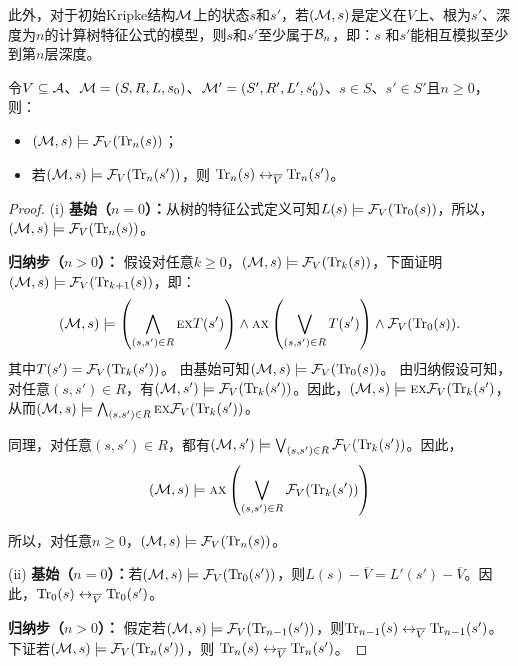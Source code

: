 此外，对于初始Kripke结构${\cal M}$上的状态$s$和$s'$，若$({\cal M},s)$是定义在$V$上、根为$s'$、深度为$n$的计算树特征公式的模型，则$s$和$s'$至少属于${\cal B}_n$，即：$s$ 和$s'$能相互模拟至少到第$n$层深度。

\begin{lemma}\label{Bn:to:Tn}
	令$V\subseteq {\cal A}$、${\cal M}=(S, R, L,s_0)$、${\cal M}'=(S', R', L',s_0')$、$s\in S$、$s'\in S'$且$n\ge 0$，则：
	\begin{itemize}
		\item[(i)] $({\cal M},s)\models{\cal F}_V(\textrm{Tr}_n(s))$；
		\item[(ii)] 若$({\cal M},s)\models{\cal F}_V(\textrm{Tr}_n(s'))$，则
		$\textrm{Tr}_n(s) \leftrightarrow_{\overline V} \textrm{Tr}_n(s')$。
	\end{itemize}
\end{lemma}
\begin{proof}
	(i) \textbf{基始（$n=0$）：}从树的特征公式定义可知$L(s) \models {\cal F}_V(\textrm{Tr}_0(s))$，所以，$({\cal M},s)\models{\cal F}_V(\textrm{Tr}_n(s))$。
	
	\textbf{归纳步（$n>0$）：} 假设对任意$k\geq 0$，$({\cal M},s)\models{\cal F}_V(\textrm{Tr}_k(s))$，下面证明$({\cal M},s)\models{\cal F}_V(\textrm{Tr}_{k+1}(s))$，即：
	\begin{equation*}
		({\cal M},s)\models \left(\bigwedge_{(s,s')\in R}
		\textsc{e} \textsc{x} T(s')\right)
		\wedge \textsc{a} \textsc{x}\left(\bigvee_{(s,s')\in R}
		T(s')\right)
		\wedge {\cal F}_V(\textrm{Tr}_0(s)).
	\end{equation*}
	其中$T(s') ={\cal F}_V(\textrm{Tr}_k(s'))$。
	由基始可知$({\cal M},s)\models {\cal F}_V(\textrm{Tr}_0(s))$。
	由归纳假设可知，对任意$(s,s') \in R$，有$({\cal M}, s') \models {\cal F}_V(\textrm{Tr}_k(s'))$。因此，$({\cal M},s)\models \textsc{e} \textsc{x} {\cal F}_V(\textrm{Tr}_k(s')$，从而$({\cal M},s)\models \bigwedge_{(s,s')\in R}
	\textsc{e} \textsc{x} {\cal F}_V(\textrm{Tr}_k(s'))$。
	
	同理，对任意$(s,s') \in R$，都有$({\cal M}, s') \models \bigvee_{(s,s')\in R} {\cal F}_V(\textrm{Tr}_k(s') )$。因此，
	$$({\cal M},s)\models \textsc{a} \textsc{x}\left(\bigvee_{(s,s')\in R}
	{\cal F}_V(\textrm{Tr}_k(s') )\right)$$
	
	所以，对任意$n\geq 0$，$({\cal M},s)\models{\cal F}_V(\textrm{Tr}_n(s))$。
	
	
	
	(ii) \textbf{基始（$n=0$）：}若$({\cal M}, s)  \models {\cal F}_V(\textrm{Tr}_0(s'))$，则$L(s) - \overline V = L'(s') - \overline V$。因此，$\textrm{Tr}_0(s) \leftrightarrow_{\overline V} \textrm{Tr}_0(s')$。
	
	\textbf{归纳步（$n>0$）：} 假定若$({\cal M},s)\models{\cal F}_V(\textrm{Tr}_{n-1}(s'))$，则$\textrm{Tr}_{n-1}(s) \leftrightarrow_{\overline V} \textrm{Tr}_{n-1}(s')$。下证若$({\cal M},s)\models{\cal F}_V(\textrm{Tr}_n(s'))$，则
	$\textrm{Tr}_n(s) \leftrightarrow_{\overline V} \textrm{Tr}_n(s')$。
	

\end{proof}
